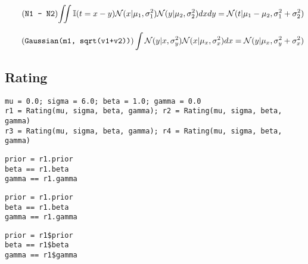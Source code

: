 \documentclass[article]{jss}
\newif\ifen
\newcommand{\en}[1]{\ifen#1\fi}
\newcommand{\N}{\mathcal{N}}
\begin{document}
%
\vspace{-0.5cm}
%
\begin{equation} \tag{\texttt{N1 - N2}} \label{eq:resta_normales}
\begin{split}
\iint \mathbb{I}(t = x - y) \N(x|\mu_1, \sigma_1^2)\N(y|\mu_2, \sigma_2^2) dxdy = \N(t|\mu_1 - \mu_2,\sigma_1^2 + \sigma_2^2)
\end{split}
\end{equation}
%
\en{Por su parte, la siguiente propiedad la computaremos ``a mano''.}
%
\begin{equation} \label{eq:normal_de_normal} \tag{\texttt{Gaussian(m1, sqrt(v1+v2))}}
\int \N(y| x, \sigma_y^2) \N(x| \mu_x, \sigma_x^2) dx = \N(y|\mu_x,\sigma_y^2 + \sigma_x^2)   
\end{equation}

\subsection{Rating} \label{sec:rating}

\en{La clase \texttt{Rating()} representa a los agentes.}
%
\en{Además de la distribución Gaussiana de creencias a priori, con media (\texttt{mu}) y desvío (\texttt{sigma}), los agentes pueden exhibir comportamientos propios como generar rendimientos con un desvío particular (\texttt{beta}) o que sus habilidades en el tiempo tengan una volatilidad especial (\texttt{gamma}).}

\begin{lstlisting}[backgroundcolor=\color{all}]
mu = 0.0; sigma = 6.0; beta = 1.0; gamma = 0.0
r1 = Rating(mu, sigma, beta, gamma); r2 = Rating(mu, sigma, beta, gamma)
r3 = Rating(mu, sigma, beta, gamma); r4 = Rating(mu, sigma, beta, gamma)
\end{lstlisting}  
%
\en{Los otros parámetros del constructor se guardan como atributos.}
%
\en{Por cuestión de eficiencia, el prior Gaussiano se guarda precomputado.}
%
%
\begin{paracol}{3}
\begin{lstlisting}[backgroundcolor=\color{julia}]
prior = r1.prior
beta == r1.beta
gamma == r1.gamma
\end{lstlisting}
\switchcolumn
\begin{lstlisting}[backgroundcolor=\color{python}]
prior = r1.prior
beta == r1.beta
gamma == r1.gamma
\end{lstlisting}
\switchcolumn
\begin{lstlisting}[backgroundcolor=\color{r}]
prior = r1$prior
beta == r1$beta
gamma == r1$gamma
\end{lstlisting}
\end{paracol}
%
\end{document}
